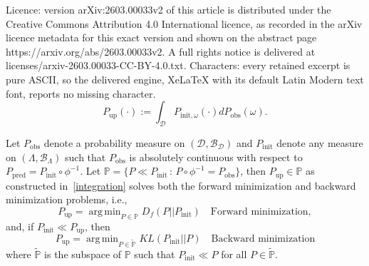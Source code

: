 \documentclass[10pt,a4paper]{amsart}
\DeclareMathOperator*{\argmin}{arg\,min}
\newcommand{\dborel}{\mathcal{B}_{\dspace}}
\newcommand{\dspace}{\mathcal{D}}
\newcommand{\initmeas}{P_{\text{init}}}
\newcommand{\obsmeas}{P_{\text{obs}}}
\newcommand{\pborel}{\mathcal{B}_{\pspace}}
\newcommand{\predictmeas}{P_\text{pred}}
\newcommand{\pspace}{\Lambda}
\newcommand{\p}{\mathbb{P}}
\newcommand{\updatemeas}{P_{\text{up}}}
\begin{document}
Licence: version arXiv:2603.00033v2 of this article is distributed under the Creative Commons Attribution 4.0 International licence, as recorded in the arXiv licence metadata for this exact version and shown on the abstract page https://arxiv.org/abs/2603.00033v2. A full rights notice is delivered at licenses/arxiv-2603.00033-CC-BY-4.0.txt. Characters: every retained excerpt is pure ASCII, so the delivered engine, XeLaTeX with its default Latin Modern text font, reports no missing character.
\begin{equation} \label{integration}
    P_\text{up}(\cdot) := \int_{\mathcal{D}} P_{\text{init}, \omega}(\cdot) dP_\text{obs}(\omega).   
\end{equation}

\begin{lemma}\label{lemma:for_bac} 
Let $\obsmeas$ denote a probability measure on $(\dspace, \dborel)$ and $\initmeas$ denote any measure on $(\pspace,\pborel)$ such that $\obsmeas$ is absolutely continuous with respect to $\predictmeas=\initmeas\circ \phi^{-1}$. 
Let $\p = \{P\ll \initmeas\, : \, P\circ \phi^{-1} = \obsmeas\}$, then $\updatemeas\in \p$ as constructed in~\eqref{integration} solves both the forward minimization and backward minimization problems, i.e., 
\[
    \updatemeas = \argmin_{P\in \p} D_{f}(P || \initmeas) \quad \text{Forward minimization},
\]
and, if $\initmeas \ll \updatemeas$, then
\[
    \updatemeas = \argmin_{P\in \tilde{\p}} KL(\initmeas || P) \quad \text{Backward minimization}
\]
where $\tilde{\p}$ is the subspace of $\p$ such that $\initmeas \ll P$ for all $P\in\tilde{\p}$.
\end{lemma}
\end{document}
